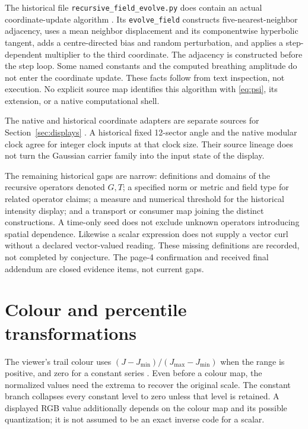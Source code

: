 \documentclass[11pt,a4paper]{article}
\theoremstyle{definition}
\theoremstyle{remark}
\begin{document}
The historical file \texttt{recursive\_field\_evolve.py}
does contain an actual coordinate-update algorithm
\cite{fieldCode}. Its \texttt{evolve\_field} constructs
five-nearest-neighbor adjacency, uses a mean neighbor
displacement and its componentwise hyperbolic tangent,
adds a centre-directed bias and random perturbation, and
applies a step-dependent multiplier to the third coordinate.
The adjacency is constructed before the step loop. Some
named constants and the computed breathing amplitude do not
enter the coordinate update. These facts follow from text
inspection, not execution. No explicit source map identifies
this algorithm with \eqref{eq:psi}, its extension, or a
native computational shell.

The native and historical coordinate adapters are separate
sources for Section~\ref{sec:displays}
\cite{diagnostics,geometry,viewer}. A historical fixed
12-sector angle and the native modular clock agree for
integer clock inputs at that clock size. Their source lineage
does not turn the Gaussian carrier family into the input
state of the display.

The remaining historical gaps are narrow: definitions and
domains of the recursive operators denoted $G,T$; a specified
norm or metric and field type for related operator claims;
a measure and numerical threshold for the historical
intensity display; and a transport or consumer map joining
the distinct constructions. A time-only seed does not
exclude unknown operators introducing spatial dependence.
Likewise a scalar expression does not supply a vector curl
without a declared vector-valued reading. These missing
definitions are recorded, not completed by conjecture.
The page-4 confirmation and received final addendum are
closed evidence items, not current gaps.

\section{Colour and percentile transformations}
\label{app:display}
The viewer's trail colour uses
$(J-J_{\min})/(J_{\max}-J_{\min})$ when the range is
positive, and zero for a constant series
\cite[lines 419--424]{viewer}. Even before a colour map,
the normalized values need the extrema to recover the
original scale. The constant branch collapses every
constant level to zero unless that level is retained.
A displayed RGB value additionally depends on the colour
map and its possible quantization; it is not assumed to
be an exact inverse code for a scalar.
\end{document}
